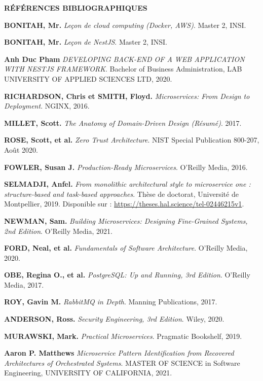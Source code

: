 \thispagestyle{normalpage}

\begin{center}
    \large \textbf{RÉFÉRENCES BIBLIOGRAPHIQUES}
\end{center}
\vspace{1cm}

\begin{enumerate}[label={[\arabic*]}]
    \item \textbf{BONITAH, Mr.} \textit{Leçon de cloud computing (Docker, AWS)}. Master 2, INSI.
    \item \textbf{BONITAH, Mr.} \textit{Leçon de NestJS}. Master 2, INSI.
    \item \textbf{Anh Duc Pham} \textit{DEVELOPING BACK-END OF A WEB APPLICATION WITH NESTJS FRAMEWORK}. Bachelor of Business Administration, LAB UNIVERSITY OF APPLIED SCIENCES LTD, 2020.
    \item \textbf{RICHARDSON, Chris et SMITH, Floyd.} \textit{Microservices: From Design to Deployment}. NGINX, 2016.
    \item \textbf{MILLET, Scott.} \textit{The Anatomy of Domain-Driven Design (Résumé)}. 2017.
    \item \textbf{ROSE, Scott, et al.} \textit{Zero Trust Architecture}. NIST Special Publication 800-207, Août 2020.
    \item \textbf{FOWLER, Susan J.} \textit{Production-Ready Microservices}. O'Reilly Media, 2016.
    \item \textbf{SELMADJI, Anfel.} \textit{From monolithic architectural style to microservice one : structure-based and task-based approaches}. Thèse de doctorat, Université de Montpellier, 2019. Disponible sur : \url{https://theses.hal.science/tel-02446215v1}.
    \item \textbf{NEWMAN, Sam.} \textit{Building Microservices: Designing Fine-Grained Systems, 2nd Edition}. O'Reilly Media, 2021.
    \item \textbf{FORD, Neal, et al.} \textit{Fundamentals of Software Architecture}. O'Reilly Media, 2020.
    \item \textbf{OBE, Regina O., et al.} \textit{PostgreSQL: Up and Running, 3rd Edition}. O'Reilly Media, 2017.
    \item \textbf{ROY, Gavin M.} \textit{RabbitMQ in Depth}. Manning Publications, 2017.
    \item \textbf{ANDERSON, Ross.} \textit{Security Engineering, 3rd Edition}. Wiley, 2020.
    \item \textbf{MURAWSKI, Mark.} \textit{Practical Microservices}. Pragmatic Bookshelf, 2019.
    \item \textbf{Aaron P. Matthews} \textit{Microservice Pattern Identification from Recovered Architectures of Orchestrated Systems}. MASTER OF SCIENCE in Software Engineering, UNIVERSITY OF CALIFORNIA, 2021.
\end{enumerate}


